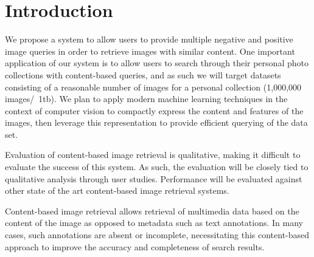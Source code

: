 \section{Introduction}
We propose a system to allow users to provide multiple negative and positive image queries in order to retrieve images with similar content.
One important application of our system is to allow users to search through their personal photo collections with content-based queries, and as
such we will target datasets consisting of a reasonable number of images for a personal collection (1,000,000 images/~1tb).
We plan to apply modern machine learning techniques in the context of computer vision to compactly express the content and features of the images, then leverage
this representation to provide efficient querying of the data set.

Evaluation of content-based image retrieval is qualitative, making it difficult to evaluate the success of this system.
As such, the evaluation will be closely tied to qualitative analysis through user studies.
Performance will be evaluated against other state of the art content-based image retrieval systems.

Content-based image retrieval allows retrieval of multimedia data based on the content of the image as opposed to metadata such as text annotations.
In many cases, such annotations are absent or incomplete, necessitating this content-based approach to improve the accuracy and completeness of search results.

